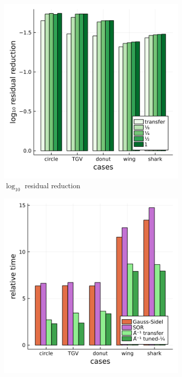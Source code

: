 \documentclass[review]{elsarticle}
\begin{document}
\begin{figure}
    \centering
    \begin{subfigure}[b]{0.48\textwidth}
        \centering
        \includegraphics[width=\textwidth]{figures/scaleloss.png}
        \caption{$\log_{10}$ residual reduction}
        \label{fig:scaled loss}
    \end{subfigure}
    \hfill
    \begin{subfigure}[b]{0.48\textwidth}
        \centering
        \includegraphics[width=\textwidth]{figures/crosscount.png}

\end{subfigure}
\end{figure}
\end{document}
